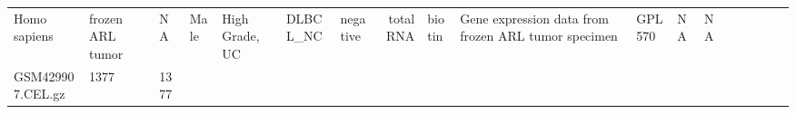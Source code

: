 \documentclass[]{article}
\begin{document}
\begin{longtable}[]{@{}lllllllrllllllllll@{}}
\begin{minipage}[t]{0.02\columnwidth}
Homo sapiens\strut
\end{minipage} & \begin{minipage}[t]{0.04\columnwidth}\raggedright
frozen ARL tumor\strut
\end{minipage} & \begin{minipage}[t]{0.05\columnwidth}\raggedleft
NA\strut
\end{minipage} & \begin{minipage}[t]{0.04\columnwidth}\raggedright
Male\strut
\end{minipage} & \begin{minipage}[t]{0.06\columnwidth}\raggedright
High Grade, UC\strut
\end{minipage} & \begin{minipage}[t]{0.06\columnwidth}\raggedright
DLBCL\_NC\strut
\end{minipage} & \begin{minipage}[t]{0.04\columnwidth}\raggedright
negative\strut
\end{minipage} & \begin{minipage}[t]{0.02\columnwidth}\raggedright
total RNA\strut
\end{minipage} & \begin{minipage}[t]{0.01\columnwidth}\raggedright
biotin\strut
\end{minipage} & \begin{minipage}[t]{0.08\columnwidth}\raggedright
Gene expression data from frozen ARL tumor specimen\strut
\end{minipage} & \begin{minipage}[t]{0.01\columnwidth}\raggedright
GPL570\strut
\end{minipage} & \begin{minipage}[t]{0.00\columnwidth}\raggedright
NA\strut
\end{minipage} & \begin{minipage}[t]{0.01\columnwidth}\raggedright
NA\strut
\end{minipage}\tabularnewline
\begin{minipage}[t]{0.03\columnwidth}\raggedright
GSM429907.CEL.gz\strut
\end{minipage} & \begin{minipage}[t]{0.02\columnwidth}\raggedright
1377\strut
\end{minipage} & \begin{minipage}[t]{0.01\columnwidth}\raggedright
1377\strut
\end{minipage} & \begin{minipage}[t]{0.02\columnwidth}\raggedright

\end{minipage}
\end{longtable}
\end{document}
